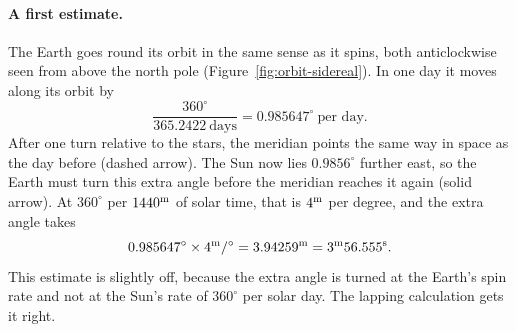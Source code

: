 \paragraph{A first estimate.} The Earth goes round its orbit in the same sense as it spins, both anticlockwise seen from above the north pole (Figure~\ref{fig:orbit-sidereal}). In one day it moves along its orbit by
\[
\frac{360^\circ}{365.2422\ \text{days}} = 0.985647^\circ\ \text{per day}.
\]
After one turn relative to the stars, the meridian points the same way in space as the day before (dashed arrow). The Sun now lies $0.9856^\circ$ further east, so the Earth must turn this extra angle before the meridian reaches it again (solid arrow). At $360^\circ$ per $1440^{\rm m}$ of solar time, that is $4^{\rm m}$ per degree, and the extra angle takes
\[
0.985647^\circ\times4^{\rm m}/^\circ = 3.94259^{\rm m} = 3^{\rm m}56.555^{\rm s}.
\]
This estimate is slightly off, because the extra angle is turned at the Earth's spin rate and not at the Sun's rate of $360^\circ$ per solar day. The lapping calculation gets it right.


